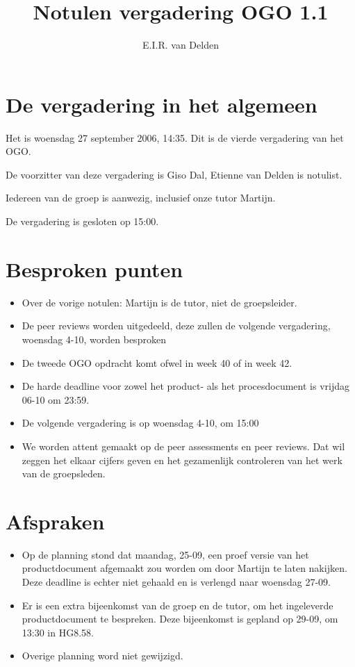 \documentclass{article}
\title{Notulen vergadering OGO 1.1}
\author{E.I.R. van Delden}
\begin{document}
\maketitle


\section{De vergadering in het algemeen}

Het is woensdag 27 september 2006, 14:35. Dit is de vierde
vergadering van het OGO.

De voorzitter van deze vergadering is Giso Dal, Etienne van Delden is
notulist.

Iedereen van de groep is aanwezig, inclusief onze tutor Martijn.

De vergadering is gesloten op 15:00.


\section{Besproken punten}

\begin{itemize}
\item Over de vorige notulen: Martijn is de tutor, niet de groepsleider. 

\item De peer reviews worden uitgedeeld, deze zullen de volgende vergadering, woensdag 4-10, worden besproken

\item De tweede OGO  opdracht komt ofwel in week 40 of in week 42.

\item De harde deadline voor zowel het product- als het procesdocument is vrijdag 06-10 om 23:59.

\item De volgende vergadering is op woensdag 4-10, om 15:00

\item We worden attent gemaakt op de peer assessments en peer reviews.
Dat wil zeggen het elkaar cijfers geven en het gezamenlijk
controleren van het werk van de groepsleden.
\end{itemize}


\section{Afspraken}

\begin{itemize}
\item Op de planning stond dat maandag, 25-09,  een proef versie van het productdocument afgemaakt zou worden om door Martijn te laten nakijken. Deze deadline is echter niet gehaald en is verlengd naar woensdag 27-09.

\item Er is een extra bijeenkomst van de groep en de tutor, om het ingeleverde productdocument te bespreken. Deze bijeenkomst is gepland op 29-09, om 13:30 in HG8.58.

\item Overige planning word niet gewijzigd.
\end{itemize}
\end{document}

